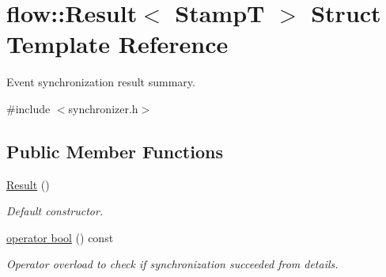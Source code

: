 \hypertarget{structflow_1_1_result}{}\section{flow\+:\+:Result$<$ StampT $>$ Struct Template Reference}
\label{structflow_1_1_result}


Event synchronization result summary.  




{\ttfamily \#include $<$synchronizer.\+h$>$}

\subsection*{Public Member Functions}
\begin{DoxyCompactItemize}
\item 
\mbox{\label{structflow_1_1_result_a7c422d1a2dbf3bf6e4cb7ae15cfe6033}} 
\hyperlink{structflow_1_1_result_a7c422d1a2dbf3bf6e4cb7ae15cfe6033}{Result} ()
\begin{DoxyCompactList}\small\item\em Default constructor. \end{DoxyCompactList}\item 
\mbox{\label{structflow_1_1_result_a4113ea1f88b4583c1a327b35fcc5eb2d}} 
\hyperlink{structflow_1_1_result_a4113ea1f88b4583c1a327b35fcc5eb2d}{operator bool} () const
\begin{DoxyCompactList}\small\item\em Operator overload to check if synchronization succeeded from details. \end{DoxyCompactList}\end{DoxyCompactItemize}
